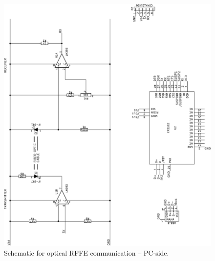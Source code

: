 \begin{figure}[htbp]
    \centering
    \includegraphics[angle=270, width=\linewidth]{img/optical_rffe/schematic_pc}
    \caption{Schematic for optical RFFE communication -- PC-side.}
    \label{fig:rffe_schematic_pc}
\end{figure}

